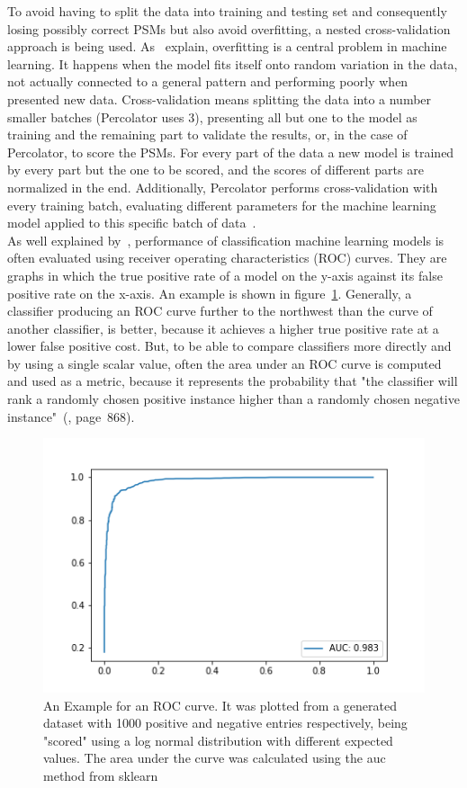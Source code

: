 	To avoid having to split the data into training and testing set and consequently losing possibly correct PSMs but also avoid overfitting, a nested cross-validation approach is being used. As~\citet{Granholm2012} explain, overfitting is a central problem in machine learning. It happens when the model fits itself onto random variation in the data, not actually connected to a general pattern and performing poorly when presented new data. Cross-validation means splitting the data into a number smaller batches (Percolator uses $3$), presenting all but one to the model as training and the remaining part to validate the results, or, in the case of Percolator, to score the PSMs. For every part of the data a new model is trained by every part but the one to be scored, and the scores of different parts are normalized in the end. Additionally, Percolator performs cross-validation with every training batch, evaluating different parameters for the machine learning model applied to this specific batch of data~\cite{Granholm2012}.\\
	As well explained by~\citet{Fawcett2006}, performance of classification machine learning models is often evaluated using receiver operating characteristics (ROC) curves. They are graphs in which the true positive rate of a model on the y-axis against its false positive rate on the x-axis. An example is shown in figure~\ref{fig:roc_example}. Generally, a classifier producing an ROC curve further to the northwest than the curve of another classifier,	is better, because it achieves a higher true positive rate at a lower false positive cost. But, to be able to compare classifiers more directly and by using a single scalar value, often the area under an ROC curve is computed and used as a metric, because it represents the probability that "the classifier will rank a randomly chosen positive instance higher than a randomly chosen negative instance"~(\cite{Fawcett2006}, page~868).
	\renewcommand{\baselinestretch}{0.9}
	\begin{figure}
		\normalsize
		\centering
		\includegraphics[width = \textwidth]{figures/ROC.png}
		\caption[Example for an ROC curve]{An Example for an ROC curve. It was plotted from a generated dataset with 1000 positive and negative entries respectively, being "scored" using a log normal distribution with different expected values. The area under the curve was calculated using the auc method from sklearn~\footnotemark}
		\label{fig:roc_example}
	\end{figure}
